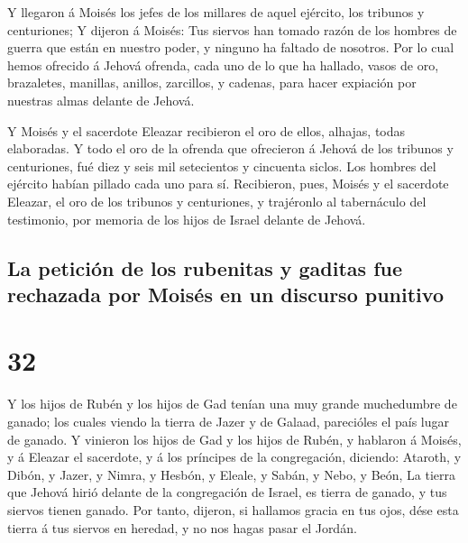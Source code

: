  Y llegaron á Moisés los jefes de los millares de aquel
ejército, los tribunos y centuriones;  Y dijeron á
Moisés: Tus siervos han tomado razón de los hombres de guerra que están
en nuestro poder, y ninguno ha faltado de nosotros.  Por
lo cual hemos ofrecido á Jehová ofrenda, cada uno de lo que ha hallado,
vasos de oro, brazaletes, manillas, anillos, zarcillos, y cadenas, para
hacer expiación por nuestras almas delante de Jehová.

 Y Moisés y el sacerdote Eleazar recibieron el oro de
ellos, alhajas, todas elaboradas.  Y todo el oro de la
ofrenda que ofrecieron á Jehová de los tribunos y centuriones, fué diez
y seis mil setecientos y cincuenta siclos.  Los hombres
del ejército habían pillado cada uno para sí. 
Recibieron, pues, Moisés y el sacerdote Eleazar, el oro de los tribunos
y centuriones, y trajéronlo al tabernáculo del testimonio, por memoria
de los hijos de Israel delante de Jehová.

\hypertarget{la-peticiuxf3n-de-los-rubenitas-y-gaditas-fue-rechazada-por-moisuxe9s-en-un-discurso-punitivo}{%
\subsection{La petición de los rubenitas y gaditas fue rechazada por
Moisés en un discurso
punitivo}\label{la-peticiuxf3n-de-los-rubenitas-y-gaditas-fue-rechazada-por-moisuxe9s-en-un-discurso-punitivo}}

\hypertarget{section-31}{%
\section{32}\label{section-31}}

 Y los hijos de Rubén y los hijos de Gad tenían una muy
grande muchedumbre de ganado; los cuales viendo la tierra de Jazer y de
Galaad, parecióles el país lugar de ganado.  Y vinieron
los hijos de Gad y los hijos de Rubén, y hablaron á Moisés, y á Eleazar
el sacerdote, y á los príncipes de la congregación, diciendo:
 Ataroth, y Dibón, y Jazer, y Nimra, y Hesbón, y Eleale, y
Sabán, y Nebo, y Beón,  La tierra que Jehová hirió delante
de la congregación de Israel, es tierra de ganado, y tus siervos tienen
ganado.  Por tanto, dijeron, si hallamos gracia en tus
ojos, dése esta tierra á tus siervos en heredad, y no nos hagas pasar el
Jordán.


